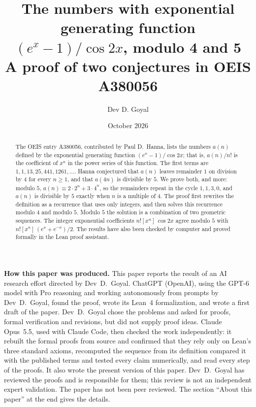 \documentclass[11pt,a4paper]{article}
\title{The numbers with exponential generating function $(e^x-1)/\cos 2x$, modulo 4 and 5\\[6pt]\large A proof of two conjectures in OEIS A380056}
\author{Dev D. Goyal}
\date{October 2026}
\theoremstyle{definition}
\theoremstyle{remark}
\newcommand{\coeff}[2]{[x^{#1}]\,#2}
\begin{document}
\maketitle
\begin{abstract}
The OEIS entry A380056, contributed by Paul D.~Hanna, lists the numbers $a(n)$ defined by the exponential generating
function $(e^x-1)/\cos 2x$; that is, $a(n)/n!$ is the coefficient of $x^n$ in the power series of this function. The
first terms are $1,1,13,25,441,1261,\dots$. Hanna conjectured that $a(n)$ leaves remainder $1$ on division by $4$ for
every $n\ge1$, and that $a(4n)$ is divisible by $5$. We prove both, and more: modulo $5$,
$a(n)\equiv2\cdot2^n+3\cdot4^n$, so the remainders repeat in the cycle $1,1,3,0$, and $a(n)$ is divisible by $5$
exactly when $n$ is a multiple of $4$. The proof first rewrites the definition as a recurrence that uses only
integers, and then solves this recurrence modulo $4$ and modulo $5$. Modulo $5$ the solution is a combination of two
geometric sequences. The integer exponential coefficients $n!\coeff{n}{\cos 2x}$ agree modulo $5$ with $n!\coeff{n}{(e^x+e^{-x})/2}$. The results have also been checked by
computer and proved formally in the Lean proof assistant.
\end{abstract}
\begin{center}\begin{minipage}{0.88\linewidth}\small
\textbf{How this paper was produced.} This paper reports the result of an AI research effort directed by
Dev~D.~Goyal. ChatGPT (OpenAI), using the GPT-6 model with Pro reasoning and working autonomously from prompts by
Dev~D.~Goyal, found the proof, wrote its Lean~4 formalization, and wrote a first draft of the paper.
Dev~D.~Goyal chose the problems and asked for proofs, formal verification and revisions, but did not supply proof
ideas. Claude Opus~5.5, used with Claude Code, then checked the work independently: it rebuilt the formal proofs from
source and confirmed that they rely only on Lean's three standard axioms, recomputed the sequence from its definition
compared it with the published terms and tested every claim numerically, and read every step of the proofs. It also wrote the present
version of this paper.
Dev~D.~Goyal has reviewed the proofs and is responsible for them; this review is not an independent expert validation.
The paper has not been peer reviewed.
The section ``About this paper'' at the end gives the details.
\end{minipage}\end{center}
\end{document}

